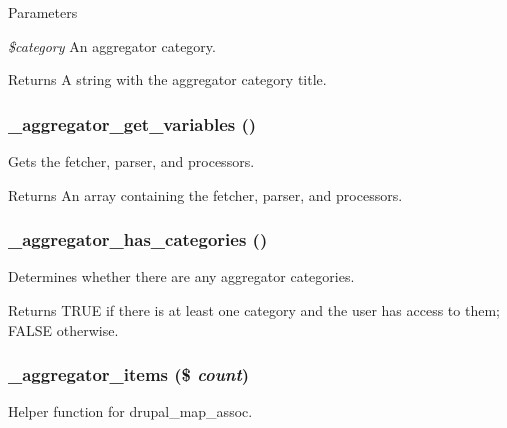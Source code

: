 \begin{DoxyParams}{Parameters}
\item[{\em \$category}]An aggregator category.\end{DoxyParams}
\begin{DoxyReturn}{Returns}
A string with the aggregator category title. 
\end{DoxyReturn}
\hypertarget{aggregator_8module_af7655d9bd4e74cb36466d65001547a3f}{
\subsubsection[{\_\-aggregator\_\-get\_\-variables}]{\setlength{\rightskip}{0pt plus 5cm}\_\-aggregator\_\-get\_\-variables ()}}
\label{aggregator_8module_af7655d9bd4e74cb36466d65001547a3f}
Gets the fetcher, parser, and processors.

\begin{DoxyReturn}{Returns}
An array containing the fetcher, parser, and processors. 
\end{DoxyReturn}
\hypertarget{aggregator_8module_a85bb1e676454db9d98ad212fe0323bd1}{
\subsubsection[{\_\-aggregator\_\-has\_\-categories}]{\setlength{\rightskip}{0pt plus 5cm}\_\-aggregator\_\-has\_\-categories ()}}
\label{aggregator_8module_a85bb1e676454db9d98ad212fe0323bd1}
Determines whether there are any aggregator categories.

\begin{DoxyReturn}{Returns}
TRUE if there is at least one category and the user has access to them; FALSE otherwise. 
\end{DoxyReturn}
\hypertarget{aggregator_8module_a9d50c74bac5811ef2e76face50ea9031}{
\subsubsection[{\_\-aggregator\_\-items}]{\setlength{\rightskip}{0pt plus 5cm}\_\-aggregator\_\-items (\$ {\em count})}}
\label{aggregator_8module_a9d50c74bac5811ef2e76face50ea9031}
Helper function for drupal\_\-map\_\-assoc.


